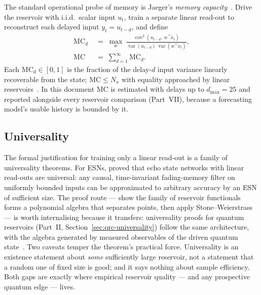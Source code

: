 The standard operational probe of memory is Jaeger's \emph{memory
capacity}~\citep{jaeger2001echo}. Drive the reservoir with i.i.d.\ scalar input
$u_t$, train a separate linear read-out to reconstruct each delayed input
$y_t = u_{t-d}$, and define
\begin{equation}
\begin{aligned}
  \mathrm{MC}_d \;&=\; \max_{w}\;
  \frac{\operatorname{cov}^2\!\left(u_{t-d},\, w^{\!\top}\tilde x_t\right)}
       {\operatorname{var}(u_{t-d})\,\operatorname{var}\!\left(w^{\!\top}\tilde x_t\right)},\\
  \mathrm{MC} \;&=\; \sum_{d=1}^{\infty} \mathrm{MC}_d .
\end{aligned}
  \label{eq:mc}
\end{equation}
Each $\mathrm{MC}_d \in [0,1]$ is the fraction of the delay-$d$ input variance
linearly recoverable from the state; $\mathrm{MC} \le N_x$ with equality
approached by linear reservoirs~\citep{jaeger2001echo,dambre2012information}.
In this document $\mathrm{MC}$ is estimated with delays up to $d_{\max}=25$ and
reported alongside every reservoir comparison (Part~VII), because a forecasting
model's usable history is bounded by it.

\subsection{Universality}
\label{sec:universality}

The formal justification for training only a linear read-out is a family of
universality theorems. For ESNs, \citet{grigoryeva2018echo} proved that echo
state networks with linear read-outs are universal: any causal, time-invariant
fading-memory filter on uniformly bounded inputs can be approximated to
arbitrary accuracy by an ESN of sufficient size. The proof route --- show the
family of reservoir functionals forms a polynomial algebra that separates
points, then apply Stone--Weierstrass --- is worth internalising because it
transfers: universality proofs for quantum reservoirs
(Part~II, Section~\ref{sec:qrc-universality}) follow the same architecture,
with the algebra generated by measured observables of the driven quantum
state~\citep{chen2019learning,nokkala2021gaussian,martinez2023finite}. Two
caveats temper the theorem's practical force. Universality is an existence
statement about \emph{some} sufficiently large reservoir, not a statement that
a random one of fixed size is good; and it says nothing about sample
efficiency. Both gaps are exactly where empirical reservoir quality --- and any
prospective quantum edge --- lives.


